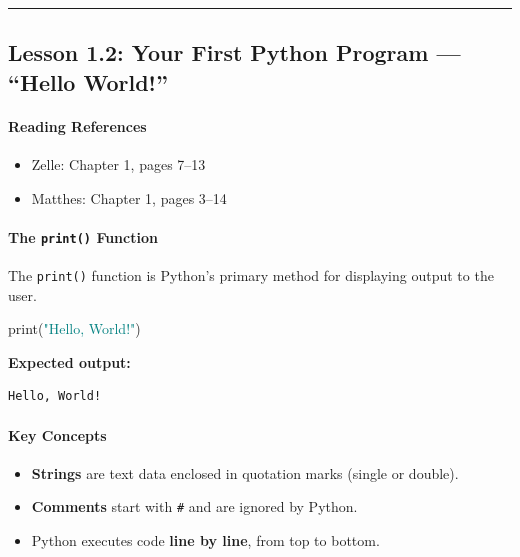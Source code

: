 \documentclass[
  justified,
  openright,
]{tufte-book}
\let\subsubsection\paragraph
\let\paragraph\paragraph
\newcommand{\BuiltInTok}[1]{#1}
\newcommand{\NormalTok}[1]{#1}
\newcommand{\StringTok}[1]{\textcolor{Teal}{#1}}
\newenvironment{Shaded}{%
  \begin{snugshade}
}{%
  \end{snugshade}
}
\let\subsubsection\paragraph
\let\paragraph\paragraph
\providecommand{\tightlist}{%
  \setlength{\itemsep}{0pt}\setlength{\parskip}{0pt}}
\begin{document}
\begin{center}\rule{0.5\linewidth}{0.5pt}\end{center}

\subsection{Lesson 1.2: Your First Python Program --- ``Hello
World!''}\label{lesson-1.2-your-first-python-program-hello-world}

\subsubsection{Reading References}\label{reading-references-5}

\begin{itemize}
\tightlist
\item
  Zelle: Chapter 1, pages 7--13
\item
  Matthes: Chapter 1, pages 3--14
\end{itemize}

\subsubsection{\texorpdfstring{The \texttt{print()}
Function}{The print() Function}}\label{the-print-function}

The \texttt{print()} function is Python's primary method for displaying
output to the user.

\begin{Shaded}
\begin{Highlighting}[]
\BuiltInTok{print}\NormalTok{(}\StringTok{"Hello, World!"}\NormalTok{)}
\end{Highlighting}
\end{Shaded}

\textbf{Expected output:}

\begin{verbatim}
Hello, World!
\end{verbatim}

\subsubsection{Key Concepts}\label{key-concepts}

\begin{itemize}
\tightlist
\item
  \textbf{Strings} are text data enclosed in quotation marks (single or
  double).
\item
  \textbf{Comments} start with \texttt{\#} and are ignored by Python.
\item
  Python executes code \textbf{line by line}, from top to bottom.
\end{itemize}
\end{document}
